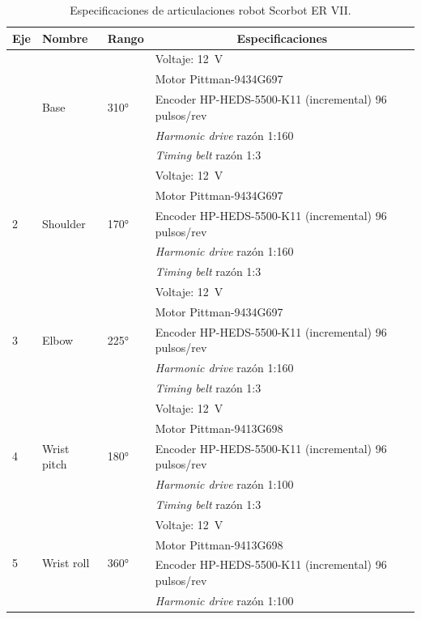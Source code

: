 \begin{table}[]
\centering
\begin{tabular}{|l|l|l|l|}
\hline
\multicolumn{1}{|c|}{\textbf{Eje}} & \textbf{Nombre} & \textbf{Rango} & \multicolumn{1}{c|}{\textbf{Especificaciones}} \\ \hline

{\multirow{5}{*}{1}} & \multirow{5}{*}{Base} & \multirow{5}{*}{\ang{310}} & Voltaje: \SI{12}{\volt} \\ \cline{4-4} 
\multicolumn{1}{|c|}{} &  &  & Motor Pittman-9434G697 \\ \cline{4-4} 
\multicolumn{1}{|c|}{} &  &  & Encoder HP-HEDS-5500-K11 (incremental) 96 pulsos/rev \\ \cline{4-4} 
\multicolumn{1}{|c|}{} &  &  & \textit{Harmonic drive} razón 1:160 \\ \cline{4-4} 
\multicolumn{1}{|c|}{} &  &  & \textit{Timing belt} razón 1:3 \\ \hline
\multirow{5}{*}{2} & \multirow{5}{*}{Shoulder} & \multirow{5}{*}{\ang{170}} & Voltaje: \SI{12}{\volt} \\ \cline{4-4} 
 &  &  & Motor Pittman-9434G697 \\ \cline{4-4} 
 &  &  & Encoder HP-HEDS-5500-K11 (incremental) 96 pulsos/rev \\ \cline{4-4} 
 &  &  & \textit{Harmonic drive} razón 1:160 \\ \cline{4-4} 
 &  &  & \textit{Timing belt} razón 1:3 \\ \hline
\multirow{5}{*}{3} & \multirow{5}{*}{Elbow} & \multirow{5}{*}{\ang{225}} & Voltaje: \SI{12}{\volt} \\ \cline{4-4} 
 &  &  & Motor Pittman-9434G697 \\ \cline{4-4} 
 &  &  & Encoder HP-HEDS-5500-K11 (incremental) 96 pulsos/rev \\ \cline{4-4} 
 &  &  & \textit{Harmonic drive} razón 1:160 \\ \cline{4-4} 
 &  &  & \textit{Timing belt} razón 1:3 \\ \hline
\multirow{5}{*}{4} & \multirow{5}{*}{Wrist pitch} & \multirow{5}{*}{\ang{180}} & Voltaje: \SI{12}{\volt} \\ \cline{4-4} 
 &  &  & Motor Pittman-9413G698 \\ \cline{4-4} 
 &  &  & Encoder HP-HEDS-5500-K11 (incremental) 96 pulsos/rev \\ \cline{4-4} 
 &  &  & \textit{Harmonic drive} razón 1:100 \\ \cline{4-4} 
 &  &  & \textit{Timing belt} razón 1:3 \\ \hline
\multirow{4}{*}{5} & \multirow{4}{*}{Wrist roll} & \multirow{4}{*}{\ang{360}} & Voltaje: \SI{12}{\volt} \\ \cline{4-4} 
 &  &  & Motor Pittman-9413G698 \\ \cline{4-4} 
 &  &  & Encoder HP-HEDS-5500-K11 (incremental) 96 pulsos/rev \\ \cline{4-4} 
 &  &  & \textit{Harmonic drive} razón 1:100 \\ \hline
\end{tabular}
\caption{Especificaciones de articulaciones robot Scorbot ER VII.}
\label{cap2_scorbot_specs}
\end{table}
